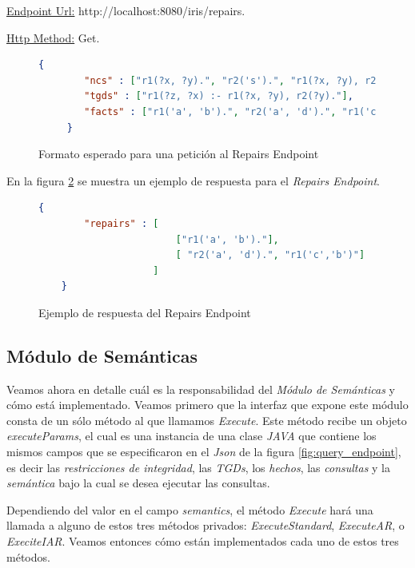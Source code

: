 \documentclass[11pt,a4paper,twoside]{tesis}
\begin{document}
\underline{Endpoint Url:} http://localhost:8080/iris/repairs.

\underline{Http Method:} Get.

\begin{figure}[ht]
    \begin{lstlisting}[language=json,firstnumber=1]
     {
    	"ncs" : ["r1(?x, ?y).", "r2('s').", "r1(?x, ?y), r2(?x)."],
    	"tgds" : ["r1(?z, ?x) :- r1(?x, ?y), r2(?y)."],
    	"facts" : ["r1('a', 'b').", "r2('a', 'd').", "r1('c','b')"]
     }
    \end{lstlisting}
    \caption{Formato esperado para una petición al Repairs Endpoint}
    \label{fig:repairs_endpoint}
\end{figure}

En la figura \ref{fig:repairs_endpoint_answer} se muestra un ejemplo de respuesta para el \textit{Repairs Endpoint}.
\begin{figure}[ht]
    \begin{lstlisting}[language=json,firstnumber=1]
    {
    	"repairs" : [
    	                ["r1('a', 'b')."], 
    	                [ "r2('a', 'd').", "r1('c','b')"]
    	            ]
    }
    \end{lstlisting}
    \caption{Ejemplo de respuesta del Repairs Endpoint}
    \label{fig:repairs_endpoint_answer}
\end{figure}
\subsection{Módulo de Semánticas}

Veamos ahora en detalle cuál es la responsabilidad del \textit{Módulo de Semánticas} y cómo está implementado. Veamos primero que la interfaz que expone este módulo consta de un sólo método al que llamamos \textit{Execute}. Este método recibe un objeto \textit{executeParams}, el cual es una instancia de una clase \textit{JAVA} que contiene los mismos campos que se especificaron en el \textit{Json} de la figura \ref{fig:query_endpoint}, es decir las \textit{restricciones de integridad}, las \textit{TGDs}, los \textit{hechos}, las \textit{consultas} y la \textit{semántica} bajo la cual se desea ejecutar las consultas.

Dependiendo del valor en el campo \textit{semantics}, el método \textit{Execute} hará una llamada a alguno de estos tres métodos privados: \textit{ExecuteStandard}, \textit{ExecuteAR}, o \textit{ExeciteIAR}. Veamos entonces cómo están implementados cada uno de estos tres métodos.
\end{document}
